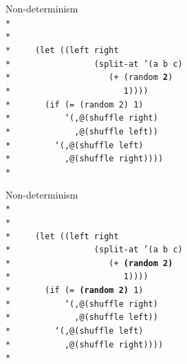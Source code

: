 \documentclass{beamer}
\begin{document}
\begin{frame}{Non-determinism}
  \texttt{
    \ \\*
    \ \\*
    \ \\*
    \ \ \ \ (let ((left right\\*
    \ \ \ \ \ \ \ \ \ \ \ \ \ \ \ \ (split-at '(a b c)\\*
    \ \ \ \ \ \ \ \ \ \ \ \ \ \ \ \ \ \ \ (+ (random \textbf{2})\\*
    \ \ \ \ \ \ \ \ \ \ \ \ \ \ \ \ \ \ \ \ \ \ 1))))\\*
    \ \ \ \ \ \ (if (= (random 2) 1)\\*
    \ \ \ \ \ \ \ \ \ \ `(,@(shuffle right)\\*
    \ \ \ \ \ \ \ \ \ \ \ \ ,@(shuffle left))\\*
    \ \ \ \ \ \ \ \ `(,@(shuffle left)\\*
    \ \ \ \ \ \ \ \ \ \ ,@(shuffle right))))\\*
    \ 
    }
\end{frame}

\begin{frame}{Non-determinism}
  \texttt{
    \ \\*
    \ \\*
    \ \\*
    \ \ \ \ (let ((left right\\*
    \ \ \ \ \ \ \ \ \ \ \ \ \ \ \ \ (split-at '(a b c)\\*
    \ \ \ \ \ \ \ \ \ \ \ \ \ \ \ \ \ \ \ (+ \textbf{(random 2)}\\*
    \ \ \ \ \ \ \ \ \ \ \ \ \ \ \ \ \ \ \ \ \ \ 1))))\\*
    \ \ \ \ \ \ (if (= \textbf{(random 2)} 1)\\*
    \ \ \ \ \ \ \ \ \ \ `(,@(shuffle right)\\*
    \ \ \ \ \ \ \ \ \ \ \ \ ,@(shuffle left))\\*
    \ \ \ \ \ \ \ \ `(,@(shuffle left)\\*
    \ \ \ \ \ \ \ \ \ \ ,@(shuffle right))))\\*
    \ 
    }
\end{frame}
\end{document}
